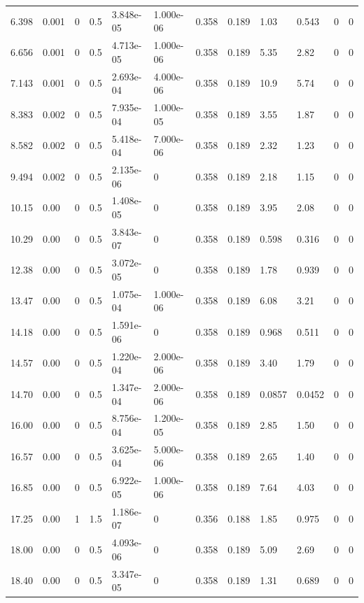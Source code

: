 \documentclass[preview]{standalone}
\begin{document}
{{\begin{tabular}{L{1.2cm}C{1.2cm} C{0.3cm}C{0.5cm} C{1.4cm}C{1.4cm} C{1.4cm}C{1.4cm} C{1.6cm}C{1.6cm} C{1.6cm}C{1.6cm}}
  6.398  &  0.001  & 0     & 0.5 &  3.848e-05  & 1.000e-06  &  0.358&   0.189& 1.03 & 0.543   &  0 & 0  \\ 
  6.656  &  0.001  & 0     & 0.5 &  4.713e-05  & 1.000e-06  &  0.358&   0.189& 5.35 & 2.82   &  0 & 0  \\ 
  7.143  &  0.001  & 0     & 0.5 &  2.693e-04  & 4.000e-06  &  0.358&   0.189& 10.9 & 5.74   &  0 & 0  \\ 
  8.383  &  0.002  & 0     & 0.5 &  7.935e-04  & 1.000e-05  &  0.358&   0.189& 3.55 & 1.87   &  0 & 0  \\ 
  8.582  &  0.002  & 0     & 0.5 &  5.418e-04  & 7.000e-06  &  0.358&   0.189& 2.32 & 1.23   &  0 & 0  \\ 
  9.494  &  0.002  & 0     & 0.5 &  2.135e-06  & 0  &  0.358&   0.189& 2.18 & 1.15   &  0 & 0  \\ 
  10.15  &  0.00  & 0     & 0.5 &  1.408e-05  & 0  &  0.358&   0.189& 3.95 & 2.08   &  0 & 0  \\ 
  10.29  &  0.00  & 0     & 0.5 &  3.843e-07  & 0  &  0.358&   0.189& 0.598 & 0.316   &  0 & 0  \\ 
  12.38  &  0.00  & 0     & 0.5 &  3.072e-05  & 0  &  0.358&   0.189& 1.78 & 0.939   &  0 & 0  \\ 
  13.47  &  0.00  & 0     & 0.5 &  1.075e-04  & 1.000e-06  &  0.358&   0.189& 6.08 & 3.21   &  0 & 0  \\ 
  14.18  &  0.00  & 0     & 0.5 &  1.591e-06  & 0  &  0.358&   0.189& 0.968 & 0.511   &  0 & 0  \\ 
  14.57  &  0.00  & 0     & 0.5 &  1.220e-04  & 2.000e-06  &  0.358&   0.189& 3.40 & 1.79   &  0 & 0  \\ 
  14.70  &  0.00  & 0     & 0.5 &  1.347e-04  & 2.000e-06  &  0.358&   0.189& 0.0857 & 0.0452   &  0 & 0  \\ 
  16.00  &  0.00  & 0     & 0.5 &  8.756e-04  & 1.200e-05  &  0.358&   0.189& 2.85 & 1.50   &  0 & 0  \\ 
  16.57  &  0.00  & 0     & 0.5 &  3.625e-04  & 5.000e-06  &  0.358&   0.189& 2.65 & 1.40   &  0 & 0  \\ 
  16.85  &  0.00  & 0     & 0.5 &  6.922e-05  & 1.000e-06  &  0.358&   0.189& 7.64 & 4.03   &  0 & 0  \\ 
  17.25  &  0.00  & 1     & 1.5 &  1.186e-07  & 0  &  0.356&   0.188& 1.85 & 0.975   &  0 & 0  \\ 
  18.00  &  0.00  & 0     & 0.5 &  4.093e-06  & 0  &  0.358&   0.189& 5.09 & 2.69   &  0 & 0  \\ 
  18.40  &  0.00  & 0     & 0.5 &  3.347e-05  & 0  &  0.358&   0.189& 1.31 & 0.689   &  0 & 0  \\ 

\end{tabular}}}
\end{document}

